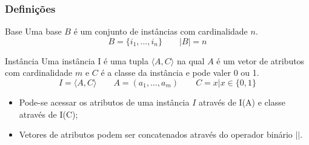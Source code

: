 \begin{frame}
    \frametitle{Definições}
    
    \begin{block}{Base}
        Uma base $B$ é um conjunto de instâncias com cardinalidade $n$.
        \[
            B = \{i_1, ..., i_n\} \qquad |B| = n
        \]
    \end{block}

    \begin{block}{Instância}
        Uma instância I é uma tupla $\langle A, C \rangle$ na qual $A$ é um vetor de atributos com cardinalidade $m$ e $C$ é a classe da instância e pode valer 0 ou 1.
        \[
            I = \langle A, C \rangle \qquad A = (a_1, ..., a_m) \qquad C = x | x \in \{0, 1\}
        \]
    \end{block}

    \begin{itemize}
        \item Pode-se acessar os atributos de uma instância $I$ através de I(A) e classe através de I(C);
        \item Vetores de atributos podem ser concatenados através do operador binário $||$.
    \end{itemize}
\end{frame}

